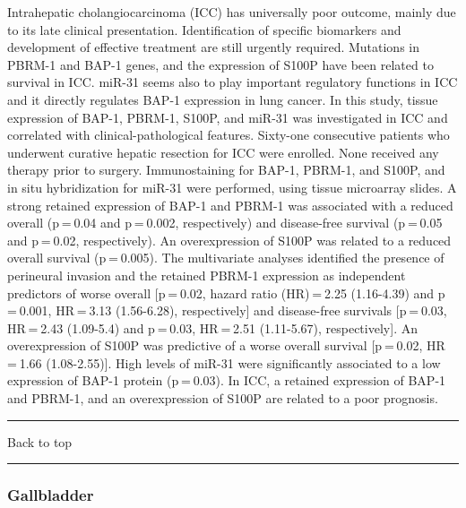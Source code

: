 \documentclass[]{article}
\begin{document}
Intrahepatic cholangiocarcinoma (ICC) has universally poor outcome,
mainly due to its late clinical presentation. Identification of specific
biomarkers and development of effective treatment are still urgently
required. Mutations in PBRM-1 and BAP-1 genes, and the expression of
S100P have been related to survival in ICC. miR-31 seems also to play
important regulatory functions in ICC and it directly regulates BAP-1
expression in lung cancer. In this study, tissue expression of BAP-1,
PBRM-1, S100P, and miR-31 was investigated in ICC and correlated with
clinical-pathological features. Sixty-one consecutive patients who
underwent curative hepatic resection for ICC were enrolled. None
received any therapy prior to surgery. Immunostaining for BAP-1, PBRM-1,
and S100P, and in situ hybridization for miR-31 were performed, using
tissue microarray slides. A strong retained expression of BAP-1 and
PBRM-1 was associated with a reduced overall (p = 0.04 and p = 0.002,
respectively) and disease-free survival (p = 0.05 and p = 0.02,
respectively). An overexpression of S100P was related to a reduced
overall survival (p = 0.005). The multivariate analyses identified the
presence of perineural invasion and the retained PBRM-1 expression as
independent predictors of worse overall {[}p = 0.02, hazard ratio
(HR) = 2.25 (1.16-4.39) and p = 0.001, HR = 3.13 (1.56-6.28),
respectively{]} and disease-free survivals {[}p = 0.03, HR = 2.43
(1.09-5.4) and p = 0.03, HR = 2.51 (1.11-5.67), respectively{]}. An
overexpression of S100P was predictive of a worse overall survival
{[}p = 0.02, HR = 1.66 (1.08-2.55){]}. High levels of miR-31 were
significantly associated to a low expression of BAP-1 protein
(p = 0.03). In ICC, a retained expression of BAP-1 and PBRM-1, and an
overexpression of S100P are related to a poor prognosis.

{}

{}

\begin{center}\rule{0.5\linewidth}{\linethickness}\end{center}

Back to top

\begin{center}\rule{0.5\linewidth}{\linethickness}\end{center}

\pagebreak

\hypertarget{gallbladder-1}{%
\subsubsection{Gallbladder}\label{gallbladder-1}}
\end{document}
